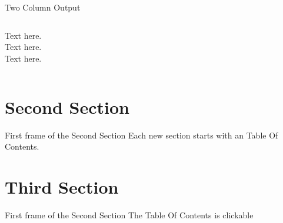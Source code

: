 \begin{frame}{Two Column Output} 
  \begin{columns}[c] 
    \column{1.5in} 
      Text here.\\ 
      Text here.\\ 
      Text here.
    \column{1.5in} 
  \end{columns} 
\end{frame} 



% 


\section{Second Section}

\begin{frame}{First frame of the Second Section} 
Each new section starts with an Table Of Contents.
\end{frame} 

\section{Third Section}
\begin{frame}{First frame of the Second Section} 
The Table Of Contents is clickable
\end{frame} 
